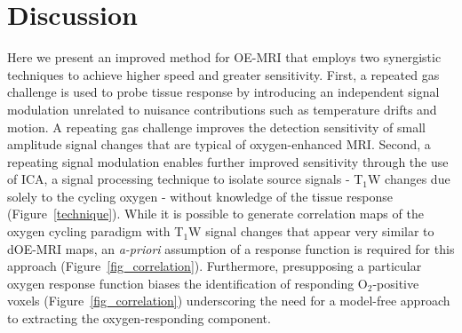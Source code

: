 
\section{Discussion}

Here we present an improved method for OE-MRI that employs two synergistic techniques to achieve higher speed and greater sensitivity.
First, a repeated gas challenge is used to probe tissue response by introducing an independent signal modulation unrelated to nuisance contributions such as temperature drifts and motion.
A repeating gas challenge improves the detection sensitivity of small amplitude signal changes that are typical of oxygen-enhanced MRI.
Second, a repeating signal modulation enables further improved sensitivity through the use of ICA, a signal processing technique to isolate source signals - T$_1$W changes due solely to the cycling oxygen - without knowledge of the tissue response (Figure~\ref{technique}).
While it is possible to generate correlation maps of the oxygen cycling paradigm with T$_1$W signal changes that appear very similar to dOE-MRI maps, an \emph{a-priori} assumption of a response function is required for this approach (Figure~\ref{fig_correlation}).
Furthermore, presupposing a particular oxygen response function biases the identification of responding O$_2$-positive voxels (Figure~\ref{fig_correlation}) underscoring the need for a model-free approach to extracting the oxygen-responding component.

